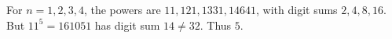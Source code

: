 For $n=1,2,3,4$, the powers are $11,121,1331,14641$, with digit sums $2,4,8,16$. But $11^5=161051$ has digit sum $14\ne32$. Thus $\boxed5$.
